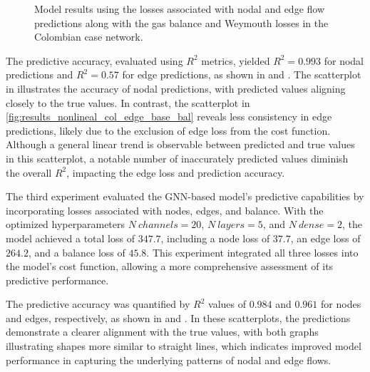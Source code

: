 \begin{figure}[htbp]
    \centering
    \setlength{}        
    \setlength{} 
    
    \caption{Model results using the losses associated with nodal and edge flow predictions along with the gas balance and Weymouth losses in the Colombian case network.}
    \label{fig:col_base_bal_results_non_lineal}
\end{figure}



The predictive accuracy, evaluated using \( R^2 \) metrics, yielded \( R^2 = 0.993 \) for nodal predictions and \( R^2 = 0.57 \) for edge predictions, as shown in  and . The scatterplot in  illustrates the accuracy of nodal predictions, with predicted values aligning closely to the true values. In contrast, the scatterplot in \cref{fig:results_nonlineal_col_edge_base_bal} reveals less consistency in edge predictions, likely due to the exclusion of edge loss from the cost function. Although a general linear trend is observable between predicted and true values in this scatterplot, a notable number of inaccurately predicted values diminish the overall \( R^2 \), impacting the edge loss and prediction accuracy.







The third experiment evaluated the GNN-based model's predictive capabilities by incorporating losses associated with nodes, edges, and balance. With the optimized hyperparameters \( N \ channels = 20 \), \( N \ layers = 5 \), and \( N \ dense = 2 \), the model achieved a total loss of \( 347.7 \), including a node loss of \( 37.7 \), an edge loss of \( 264.2 \), and a balance loss of \( 45.8 \). This experiment integrated all three losses into the model's cost function, allowing a more comprehensive assessment of its predictive performance.

The predictive accuracy was quantified by \( R^2 \) values of \( 0.984 \) and \( 0.961 \) for nodes and edges, respectively, as shown in  and . In these scatterplots, the predictions demonstrate a clearer alignment with the true values, with both graphs illustrating shapes more similar to straight lines, which indicates improved model performance in capturing the underlying patterns of nodal and edge flows.


